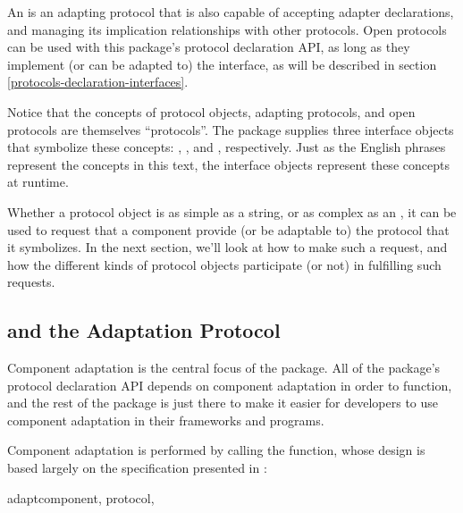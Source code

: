 \begin{verbatim%
}
\begin{verbatim%
}
An  is an adapting protocol that is also capable of
accepting adapter declarations, and managing its implication relationships
with other protocols.  Open protocols can be used with this package's
protocol declaration API, as long as they implement (or can be adapted to)
the  interface, as will be described in section
\ref{protocols-declaration-interfaces}.

Notice that the concepts of protocol objects, adapting protocols, and open
protocols are themselves ``protocols''.  The  package supplies
three interface objects that symbolize these concepts: ,
, and , respectively.  Just as
the English phrases represent the concepts in this text, the interface objects
represent these concepts at runtime.

Whether a protocol object is as simple as a string, or as complex as an
, it can be used to request that a component provide
(or be adaptable to) the protocol that it symbolizes.  In the next section,
we'll look at how to make such a request, and how the different kinds of
protocol objects participate (or not) in fulfilling such requests.






















\subsection{ and the Adaptation Protocol
\label{adapt-protocol}}

Component adaptation is the central focus of the  package.
All of the package's protocol declaration API depends on component adaptation
in order to function, and the rest of the package is just there to make it
easier for developers to use component adaptation in their frameworks and
programs.

Component adaptation is performed by calling the  function,
whose design is based largely on the specification presented in :

\begin{funcdesc}{adapt}{component, protocol,
}


\end{funcdesc}
\end{verbatim%
}
\end{verbatim%
}
